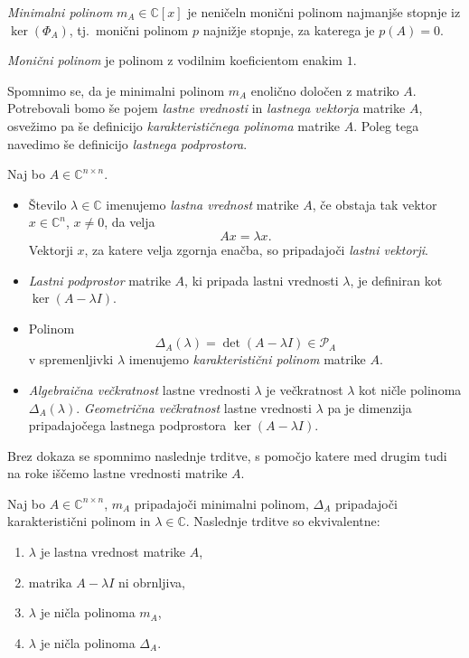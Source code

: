 \documentclass[mat1]{fmfdelo}
\newcommand{\C}{\mathbb C}
\begin{document}
\begin{definicija}
    \emph{Minimalni polinom} $m_A \in \C[x]$ je neničeln monični polinom najmanjše stopnje iz $\ker(\Phi_A)$, tj.\ monični polinom $p$ najnižje stopnje, za katerega je $p(A) = 0$.
\end{definicija}
\begin{opomba}
    \emph{Monični polinom} je polinom z vodilnim koeficientom enakim $1$.
\end{opomba}
Spomnimo se, da je minimalni polinom $m_A$ enolično določen z matriko $A$. Potrebovali bomo še pojem \emph{lastne vrednosti} in \emph{lastnega vektorja} matrike $A$, osvežimo pa še definicijo \emph{karakterističnega polinoma} matrike $A$. Poleg tega navedimo še definicijo \emph{lastnega podprostora}.
\begin{definicija}
    Naj bo $A \in \C^{n\times n}$.
    \begin{itemize}
        \item Število $\lambda \in \C$ imenujemo \emph{lastna vrednost} matrike $A$, če obstaja tak vektor $x \in \C^n$, $x \neq 0$, da velja
        \begin{equation*}
            Ax = \lambda x.
        \end{equation*}
        Vektorji $x$, za katere velja zgornja enačba, so pripadajoči \emph{lastni vektorji}.
        \item \emph{Lastni podprostor} matrike $A$, ki pripada lastni vrednosti $\lambda$, je definiran kot $\ker (A - \lambda I)$.
        \item Polinom
        \begin{equation*}
            \Delta_A(\lambda) = \det (A - \lambda I) \in \mathcal{P}_A
        \end{equation*}
        v spremenljivki $\lambda$ imenujemo \emph{karakteristični polinom} matrike $A$.
        \item \emph{Algebraična večkratnost} lastne vrednosti $\lambda$ je večkratnost $\lambda$ kot ničle polinoma $\Delta_A(\lambda)$. \emph{Geometrična večkratnost} lastne vrednosti $\lambda$ pa je dimenzija pripadajočega lastnega podprostora $\ker (A - \lambda I)$.
    \end{itemize}
\end{definicija}
Brez dokaza se spomnimo naslednje trditve, s pomočjo katere med drugim tudi na roke iščemo lastne vrednosti matrike $A$.
\begin{trditev}
    Naj bo $A \in \C^{n \times n}$, $m_A$ pripadajoči minimalni polinom, $\Delta_A$ pripadajoči karakteristični polinom in $\lambda \in \C$. Naslednje trditve so ekvivalentne:
    \begin{enumerate}
        \item $\lambda$ je lastna vrednost matrike $A$,
        \item matrika $A- \lambda I$ ni obrnljiva,
        \item $\lambda$ je ničla polinoma $m_A$,
        \item $\lambda$ je ničla polinoma $\Delta_A$.
    \end{enumerate}
\end{trditev}
\end{document}
